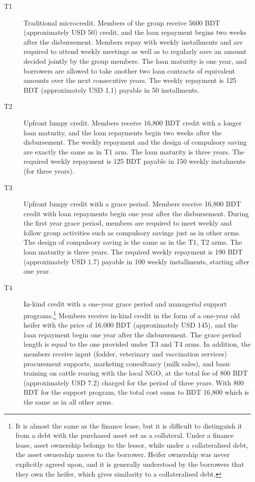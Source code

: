 	\begin{description}
	\vspace{1.0ex}\setlength{\itemsep}{1.0ex}\setlength{\baselineskip}{12pt}
	\item[T1]	Traditional microcredit. Members of the group receive 5600 BDT (approximately USD 50) credit, and the loan repayment begins two weeks after the disbursement. Members repay with weekly installments and are required to attend weekly meetings as well as to regularly save an amount decided jointly by the group members. The loan maturity is one year, and borrowers are allowed to take another two loan contracts of equivalent amounts over the next consecutive years. The weekly repayment is 125 BDT (approximately USD 1.1) payable in 50 installments.
	\item[T2]	Upfront lumpy credit. Members receive 16,800 BDT credit with a longer loan maturity, and the loan repayments begin two weeks after the disbursement. The weekly repayment and the design of compulsory saving are exactly the same as in \textsf{T1} arm. The loan maturity is three years. The required weekly repayment is 125 BDT payable in 150 weekly instalments (for three years). 
	\item[T3]	Upfront lumpy credit with a grace period. Members receive 16,800 BDT credit with loan repayments begin one year after the disbursement. During the first year grace period, members are required to meet weekly and follow group activities such as compulsory savings just as in other arms. The design of compulsory saving is the same as in the \textsf{T1}, \textsf{T2} arms. The loan maturity is three years. The required weekly repayment is 190 BDT (approximately USD 1.7) payable in 100 weekly installments, starting after one year.
	\item[T4]	In-kind credit with a one-year grace period and managerial support programs.\footnote{It is almost the same as the finance lease, but it is difficult to distinguish it from a debt with the purchased asset set as a collateral. Under a finance lease, asset ownership belongs to the lessor, while under a collateralised debt, the asset ownership moves to the borrower. Heifer ownership was never explicitly agreed upon, and it is generally understood by the borrowers that they own the heifer, which gives similarity to a collateralised debt. } Members receive in-kind credit in the form of a one-year old heifer with the price of 16,000 BDT (approximately USD 145), and the loan repayment begin one year after the disbursement. The grace period length is equal to the one provided under \textsf{T3} and \textsf{T4} arms. %
	In addition, the members receive input (fodder, veterinary and vaccination services) procurement supports, marketing consultancy (milk sales), and basic training on cattle rearing with the local NGO, at the total fee of 800 BDT (approximately USD 7.2) charged for the period of three years. With 800 BDT for the support program, the total cost sums to BDT 16,800 which is the same as in all other arms.
	\end{description}

